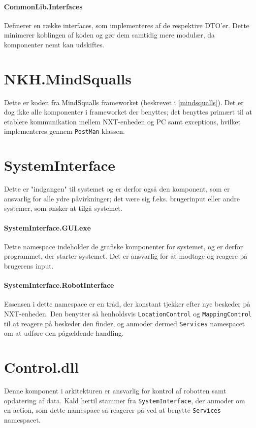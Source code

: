 \paragraph{CommonLib.Interfaces}
Definerer en række interfaces, som implementeres af de respektive DTO'er.
Dette minimerer koblingen af koden og gør dem samtidig mere modulær, da komponenter nemt kan udskiftes.

\section{NKH.MindSqualls}\label{arkitektur:mindsqualls}
Dette er koden fra MindSqualls frameworket (beskrevet i \cref{mindsqualls}).
Det er dog ikke alle komponenter i frameworket der benyttes; det benyttes primært til at etablere kommunikation mellem NXT-enheden og PC samt exceptions, hvilket implementeres gennem \lstinline[style=csharp]|PostMan| klassen.

\section{SystemInterface}\label{arkitektur:systeminterface}
Dette er "indgangen" til systemet og er derfor også den komponent, som er ansvarlig for alle ydre påvirkninger; det være sig f.eks. brugerinput eller andre systemer, som ønsker at tilgå systemet.

\paragraph{SystemInterface.GUI.exe}
Dette namespace indeholder de grafiske komponenter for systemet, og er derfor programmet, der starter systemet.
Det er ansvarlig for at modtage og reagere på brugerens input.

\paragraph{SystemInterface.RobotInterface}
Essensen i dette namespace er en tråd, der konstant tjekker efter nye beskeder på NXT-enheden.
Den benytter så henholdsvis \lstinline[style=csharp]|LocationControl| og \lstinline[style=csharp]|MappingControl| til at reagere på beskeder den finder, og anmoder dermed \lstinline[style=csharp]!Services! namespacet om at udføre den pågældende handling.

\section{Control.dll}\label{arkitektur:control}
Denne komponent i arkitekturen er ansvarlig for kontrol af robotten samt opdatering af data.
Kald hertil stammer fra \lstinline[style=csharp]!SystemInterface!, der anmoder om en action, som dette namespace så reagerer på ved at benytte \lstinline[style=csharp]!Services! namespacet.

